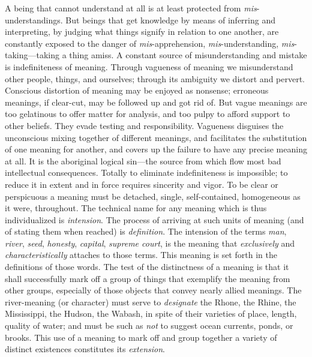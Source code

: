 \documentclass[letterpaper]{book}
\begin{document}



A being that cannot understand at all is at least protected from
\emph{mis}-understandings. But beings that get knowledge by means of
inferring and interpreting, by judging what things signify in relation
to one another, are constantly exposed to the danger of
\emph{mis}-apprehension, \emph{mis}-understanding,
\emph{mis}-taking---taking a thing amiss. A constant source of
misunderstanding and mistake is indefiniteness of meaning. Through
vagueness
of
meaning we misunderstand other people, things, and ourselves; through
its ambiguity we distort and pervert. Conscious distortion of meaning
may be enjoyed as nonsense; erroneous meanings, if clear-cut, may be
followed up and got rid of. But vague meanings are too gelatinous to
offer matter for analysis, and too pulpy to afford support to other
beliefs. They evade testing and responsibility. Vagueness disguises the
unconscious mixing together of different meanings, and facilitates the
substitution of one meaning for another, and covers up the failure to
have any precise meaning at all. It is the aboriginal logical sin---the
source from which flow most bad intellectual consequences. Totally to
eliminate indefiniteness is impossible; to reduce it in extent and in
force requires sincerity and vigor. To be clear or perspicuous a meaning
must be detached, single, self-contained, homogeneous as it were,
throughout. The technical name for any meaning which is thus
individualized is \emph{intension}. The process of arriving at such
units of meaning (and of stating them when reached) is
\emph{definition}. The intension of the terms \emph{man}, \emph{river},
\emph{seed}, \emph{honesty}, \emph{capital}, \emph{supreme court}, is
the meaning that \emph{exclusively} and \emph{characteristically}
attaches to those terms. This meaning is set forth in the definitions of
those words. The test of the distinctness of a meaning is that it shall
successfully mark off a group of things that exemplify the meaning from
other groups, especially of those objects that convey nearly allied
meanings. The river-meaning (or character) must serve to
\emph{designate} the Rhone, the Rhine, the Mississippi, the Hudson, the
Wabash, in spite of their varieties of place, length, quality of water;
and must be such as \emph{not} to suggest ocean currents, ponds, or
brooks. This use of a
meaning
to mark off and group together a variety of distinct existences
constitutes its \emph{extension}.
\end{document}
